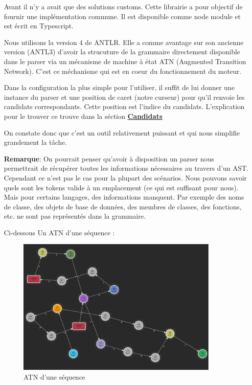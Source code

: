 \documentclass[
    iict, %
    il, %
]{heig-tb}
\begin{document}
Avant il n'y a avait que des solutions customs. Cette librairie a pour objectif de fournir une implémentation commune. Il est disponible comme node module et est écrit en Typescript.

Nous utilisons la version 4 de ANTLR. Elle a comme avantage sur son ancienne version (ANTL3) d'avoir la strucuture de la grammaire directement disponible dans le parser via
un mécanisme de machine à état ATN (Augmented Transition Network). C'est ce méchanisme qui est en coeur du fonctionnement du moteur.

Dans la configuration la plus simple pour l'utiliser, il suffit de lui donner une instance du parser et une position de caret (notre curseur) pour qu'il renvoie les candidats correspondants.
Cette position est l'indice du candidats. L'explication pour le trouver ce trouve dans la séction \hyperref[candidates]{\textbf{Candidats}}

On constate donc que c'est un outil relativement puissant et qui nous simplifie grandement la tâche.

\textbf{Remarque}: On pourrait penser qu'avoir à disposition un parser nous permettrait de récupérer toutes les informations nécessaires au travers d'un AST. Cependant ce n'est pas le cas pour la plupart des scénarios.
Nous pouvons savoir quels sont les tokens valide à un emplacement (ce qui est suffisant pour nous). Mais pour certains langages, des informations manquent. Par exemple des noms de classe, des objets de base de données, des membres de classes, des fonctions, etc. ne sont pas représentés dans la grammaire. 

Ci-dessous Un ATN d'une séquence :

\begin{figure}[!ht]
    \begin{center}
        \includegraphics[width=10cm]{assets/figures/seq_ATN.png}
    \end{center}
    \caption[ATN d'une séquence]{\label{seq_ATN} ATN d'une séquence}
\end{figure}
\end{document}
